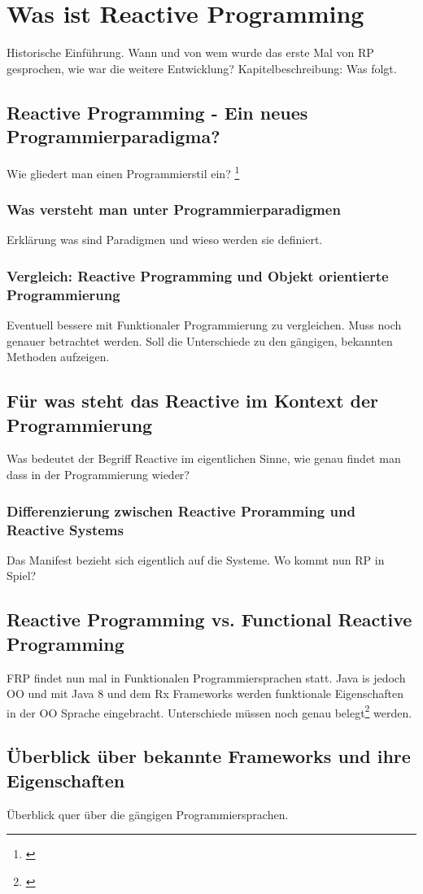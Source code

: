 \chapter{Was ist Reactive Programming}\label{was_ist_reactive_programming}
Historische Einführung. Wann und von wem wurde das erste Mal von RP gesprochen, wie war die weitere Entwicklung?
Kapitelbeschreibung: Was folgt. 
\section{Reactive Programming - Ein neues Programmierparadigma?}
Wie gliedert man einen Programmierstil ein? \footnote{\cite{Bainomugisha.2013}}
\subsection{Was versteht man unter Programmierparadigmen}
 Erklärung was sind Paradigmen und wieso werden sie definiert.
\subsection{Vergleich: Reactive Programming und Objekt orientierte Programmierung}
Eventuell bessere mit Funktionaler Programmierung zu vergleichen. Muss noch genauer betrachtet werden. Soll die Unterschiede zu den gängigen, bekannten Methoden aufzeigen.
\section{Für was steht das Reactive im Kontext der Programmierung}
Was bedeutet der Begriff Reactive im eigentlichen Sinne, wie genau findet man dass in der Programmierung wieder?
\subsection{Differenzierung zwischen Reactive Proramming und Reactive Systems}
Das Manifest bezieht sich eigentlich auf die Systeme. Wo kommt nun RP in Spiel? 
\section{Reactive Programming vs. Functional Reactive Programming}
FRP findet nun mal in Funktionalen Programmiersprachen statt. Java is jedoch OO und mit Java 8 und dem Rx Frameworks werden funktionale Eigenschaften in der OO Sprache eingebracht. Unterschiede müssen noch genau belegt\footnote{\cite{JanCarstenLohmuller.2016}} werden.
\section{Überblick über bekannte Frameworks und ihre Eigenschaften}
Überblick quer über die gängigen Programmiersprachen. 
